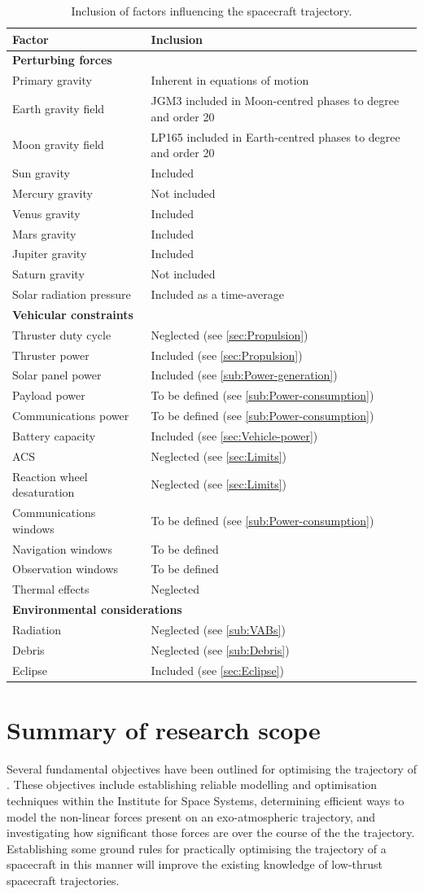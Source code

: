 \begin{table}
\centering
\caption{Inclusion of factors influencing the spacecraft trajectory.} \label{tab:Scope-limitations}
\begin{tabular}{p{} p{}} \toprule
Factor & Inclusion \tabularnewline\midrule
\textbf{Perturbing forces} \tabularnewline
Primary gravity & Inherent in equations of motion \tabularnewline
Earth gravity field & JGM3 included in Moon-centred phases to degree and order 20\tabularnewline
Moon gravity field & LP165 included in Earth-centred phases to degree and order 20\tabularnewline
Sun gravity & Included \tabularnewline
Mercury gravity & Not included \tabularnewline
Venus gravity & Included \tabularnewline
Mars gravity & Included \tabularnewline
Jupiter gravity & Included \tabularnewline
Saturn gravity & Not included \tabularnewline
Solar radiation pressure & Included as a time-average \tabularnewline
\textbf{Vehicular constraints} \tabularnewline
Thruster duty cycle & Neglected (see \autoref{sec:Propulsion}) \tabularnewline
Thruster power & Included (see \autoref{sec:Propulsion}) \tabularnewline
Solar panel power & Included (see \autoref{sub:Power-generation}) \tabularnewline
Payload power & To be defined (see \autoref{sub:Power-consumption}) \tabularnewline
Communications power & To be defined (see \autoref{sub:Power-consumption}) \tabularnewline
Battery capacity & Included (see \autoref{sec:Vehicle-power}) \tabularnewline
ACS & Neglected (see \autoref{sec:Limits}) \tabularnewline
Reaction wheel desaturation & Neglected (see \autoref{sec:Limits})\tabularnewline
Communications windows & To be defined (see \autoref{sub:Power-consumption}) \tabularnewline
Navigation windows & To be defined \tabularnewline
Observation windows & To be defined \tabularnewline
Thermal effects & Neglected \tabularnewline\midrule
\multicolumn{2}{l}{\textbf{Environmental considerations}} \tabularnewline
Radiation & Neglected (see \autoref{sub:VABs}) \tabularnewline
Debris & Neglected (see \autoref{sub:Debris}) \tabularnewline
Eclipse & Included (see \autoref{sec:Eclipse}) \tabularnewline
\bottomrule
\end{tabular}
\end{table}

\section{Summary of research scope} \label{sec:Objective-summary}

Several fundamental objectives have been outlined for optimising the trajectory of \BW. These objectives include establishing reliable modelling and optimisation techniques within the Institute for Space Systems, determining efficient ways to model the non-linear forces present on an exo-atmospheric trajectory, and investigating how significant those forces are over the course of the the trajectory. Establishing some ground rules for practically optimising the trajectory of a spacecraft in this manner will improve the existing knowledge of low-thrust spacecraft trajectories.